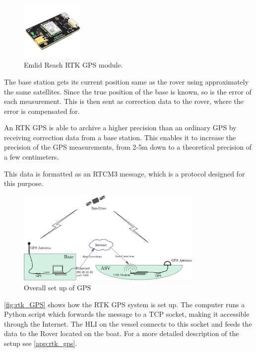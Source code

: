\begin{figure}[H]
  \includegraphics[width=0.27\textwidth]{figures/emlidReach}
  \caption{Emlid Reach RTK GPS module.\cite{EmlidReachDocs}}
  \label{fig:emlidReach}
\end{figure}

The base station gets its current position same as the rover using approximately the same satellites. Since the true position of the base is known, so is the error of each measurement. This is then sent as correction data to the rover, where the error is compensated for.%

An RTK GPS is able to archive a higher precision than an ordinary GPS by receiving correction data from a base station.
This enables it to increase the precision of the GPS measurements, from 2-5m down to a theoretical precision of a few centimeters.\cite{EmlidRTK}

This data is formatted as an RTCM3 message, which is a protocol designed for this purpose.\\

\begin{figure}[H]
	\includegraphics[width=0.8\textwidth]{figures/comunicationSetup.pdf}
	\caption{Overall set up of GPS}
	\label{fig:rtk_GPS}
\end{figure}
%
\autoref{fig:rtk_GPS} shows how the RTK GPS system is set up. 
The computer runs a Python script which forwards the message to a TCP socket, making it accessible through the Internet. 
The HLI on the vessel connects to this socket and feeds the data to the Rover located on the boat.
For a more detailed description of the setup see \autoref{app:rtk_gps}.
